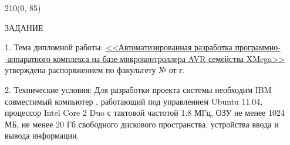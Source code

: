 \begin{textblock}{210}(0, 85)
\end{textblock}


\vspace{1.5em}

\begin{center}
	\MakeUppercase{Задание}
\end{center}

\begin{flushleft}
1. Тема дипломной работы: \underline{<<Автоматизированная разработка программно-}\\
\underline{-аппаратного комплекса на базе микроконтроллера AVR семейства XMega>>} \\
утверждена распоряжением по факультету № \underline{\makebox[12mm]{}} от \underline{\makebox[50mm]{}} г.\\
\end{flushleft}

\begin{flushleft}
2. Технические условия: Для разработки проекта системы необходим IBM совместимый компьютер
, работающий под управлением Ubuntu 11.04, процессор Intel Core 2 Duo с тактовой
частотой 1.8 МГц, ОЗУ не менее 1024 МБ, не менее 20 Гб свободного дискового пространства,
устройства ввода и вывода информации.
\end{flushleft}

